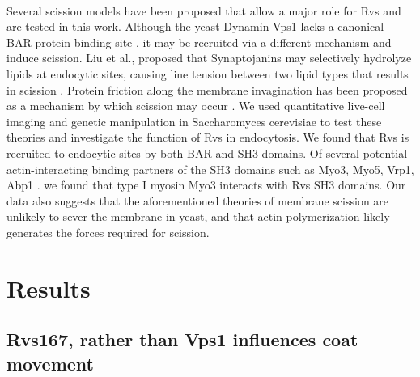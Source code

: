 \documentclass[9pt,lineno]{elife}
\begin{document}
~\\
Several scission models have been proposed that allow a major role for Rvs and are tested in this work. Although the yeast Dynamin Vps1 lacks a canonical BAR-protein binding site \cite{Bui2012,Moustaq2016}, it may be recruited via a different mechanism and induce scission. Liu et al., proposed that Synaptojanins may selectively hydrolyze lipids at endocytic sites, causing line tension between two lipid types that results in scission \cite{Liu2009}. Protein friction along the membrane invagination has been proposed as a mechanism by which scission may occur \cite{Simunovic2017b}. We used quantitative live-cell imaging and genetic manipulation in Saccharomyces cerevisiae to test these theories and investigate the function of Rvs in endocytosis. We found that Rvs is recruited to endocytic sites by both BAR and SH3 domains. Of several potential actin-interacting binding partners of the SH3 domains such as Myo3, Myo5, Vrp1, Abp1 \cite{Lila1997,Colwill1999,Madania1999,Liu2009}. we found that type I myosin Myo3 interacts with Rvs SH3 domains. Our data also suggests that the aforementioned theories of membrane scission are unlikely to sever the membrane in yeast, and that actin polymerization likely generates the forces required for scission. 



\section{Results}

\subsection{Rvs167, rather than Vps1 influences coat movement}
\end{document}
